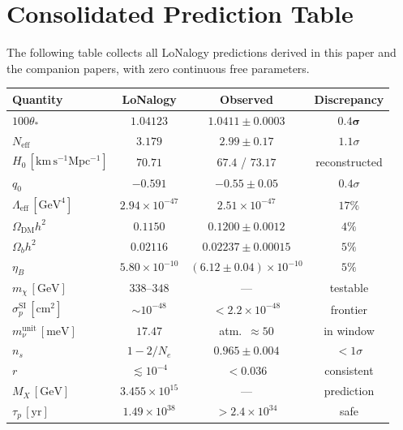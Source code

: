 \documentclass[12pt]{article}
\theoremstyle{plain}
\theoremstyle{definition}
\numberwithin{equation}{section}
\newcommand{\eff}{\mathrm{eff}}
\begin{document}
\section*{Consolidated Prediction Table}

The following table collects all LoNalogy predictions derived in this paper
and the companion papers, with zero continuous free parameters.

\begin{center}
\begin{tabular}{lccc}
\toprule
Quantity & LoNalogy & Observed & Discrepancy\\
\midrule
$100\theta_*$ & $\mathbf{1.04123}$ & $1.0411\pm0.0003$ & $\mathbf{0.4\sigma}$\\
$N_{\eff}$ & $3.179$ & $2.99\pm0.17$ & $1.1\sigma$\\
$H_0\,[\mathrm{km\,s^{-1}Mpc^{-1}}]$ & $70.71$ & $67.4$ / $73.17$ & reconstructed\\
$q_0$ & $-0.591$ & $-0.55\pm0.05$ & $0.4\sigma$\\
\midrule
$\Lambda_{\eff}\,[\mathrm{GeV}^4]$ & $2.94\times10^{-47}$ & $2.51\times10^{-47}$ & $17\%$\\
$\Omega_{\mathrm{DM}}h^2$ & $0.1150$ & $0.1200\pm0.0012$ & $4\%$\\
$\Omega_b h^2$ & $0.02116$ & $0.02237\pm0.00015$ & $5\%$\\
$\eta_B$ & $5.80\times10^{-10}$ & $(6.12\pm0.04)\times10^{-10}$ & $5\%$\\
$m_\chi\,[\mathrm{GeV}]$ & $338$--$348$ & --- & testable\\
$\sigma_p^{\mathrm{SI}}\,[\mathrm{cm}^2]$ & $\sim10^{-48}$ & $<2.2\times10^{-48}$ & frontier\\
$m_\nu^{\mathrm{unit}}\,[\mathrm{meV}]$ & $17.47$ & atm.~$\approx50$ & in window\\
$n_s$ & $1-2/N_e$ & $0.965\pm0.004$ & $<1\sigma$\\
$r$ & $\lesssim10^{-4}$ & $<0.036$ & consistent\\
$M_X\,[\mathrm{GeV}]$ & $3.455\times10^{15}$ & --- & prediction\\
$\tau_p\,[\mathrm{yr}]$ & $1.49\times10^{38}$ & $>2.4\times10^{34}$ & safe\\
\bottomrule
\end{tabular}
\end{center}
\end{document}
